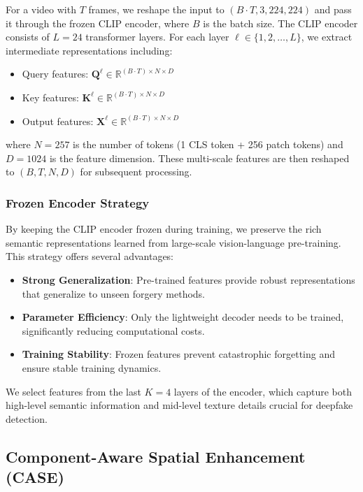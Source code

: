 For a video with $T$ frames, we reshape the input to $(B \cdot T, 3, 224, 224)$ and pass it through the frozen CLIP encoder, where $B$ is the batch size. The CLIP encoder consists of $L=24$ transformer layers. For each layer $\ell \in \{1, 2, \ldots, L\}$, we extract intermediate representations including:

\begin{itemize}
\item Query features: $\mathbf{Q}^\ell \in \mathbb{R}^{(B \cdot T) \times N \times D}$
\item Key features: $\mathbf{K}^\ell \in \mathbb{R}^{(B \cdot T) \times N \times D}$
\item Output features: $\mathbf{X}^\ell \in \mathbb{R}^{(B \cdot T) \times N \times D}$
\end{itemize}

where $N = 257$ is the number of tokens (1 CLS token + 256 patch tokens) and $D = 1024$ is the feature dimension. These multi-scale features are then reshaped to $(B, T, N, D)$ for subsequent processing.

\subsubsection{Frozen Encoder Strategy}

By keeping the CLIP encoder frozen during training, we preserve the rich semantic representations learned from large-scale vision-language pre-training. This strategy offers several advantages:

\begin{itemize}
\item \textbf{Strong Generalization}: Pre-trained features provide robust representations that generalize to unseen forgery methods.
\item \textbf{Parameter Efficiency}: Only the lightweight decoder needs to be trained, significantly reducing computational costs.
\item \textbf{Training Stability}: Frozen features prevent catastrophic forgetting and ensure stable training dynamics.
\end{itemize}

We select features from the last $K=4$ layers of the encoder, which capture both high-level semantic information and mid-level texture details crucial for deepfake detection.

\subsection{Component-Aware Spatial Enhancement (CASE)}


